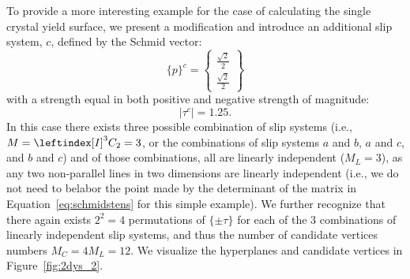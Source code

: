 \documentclass[preprint,3p,times,sort&compress,letterpaper,12pt]{elsarticle} %
\begin{document}
To provide a more interesting example for the case of calculating the single crystal yield surface, we present a modification and introduce an additional slip system, $c$, defined by the Schmid vector:
\begin{equation}
    \{p\}^{c} = \begin{Bmatrix}
        \frac{\sqrt{2}}{2} \\
        \frac{\sqrt{2}}{2}
    \end{Bmatrix}
\end{equation}
with a strength equal in both positive and negative strength of magnitude:
\begin{equation}
    \left|\tau^c\right| = 1.25.
\end{equation}
In this case there exists three possible combination of slip systems (i.e., $M=\leftindex[I]^3 {C}_2=3$, or the combinations of slip systems $a$ and $b$, $a$ and $c$, and $b$ and $c$) and of those combinations, all are linearly independent ($M_L=3$), as any two non-parallel lines in two dimensions are linearly independent (i.e., we do not need to belabor the point made by the determinant of the matrix in Equation~\ref{eq:schmidstens} for this simple example). We further recognize that there again exists $2^2=4$ permutations of $\{\pm\tau\}$ for each of the 3 combinations of linearly independent slip systems, and thus the number of candidate vertices numbers $M_C=4M_L=12$. We visualize the hyperplanes and candidate vertices in Figure~\ref{fig:2dys_2}.
\end{document}
